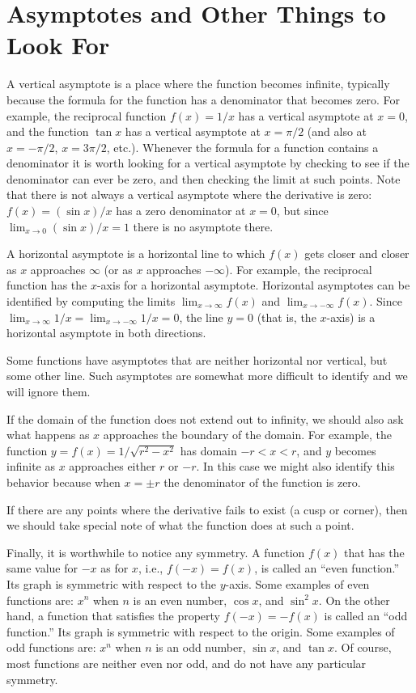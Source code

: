 \section{Asymptotes and Other Things to Look For}  {}{}
\nobreak
A vertical asymptote is a place where the function
becomes infinite, typically because the formula for the function has a
denominator that becomes zero.  For example, the reciprocal function
$f(x)=1/x$ has a vertical asymptote at $x=0$, and the function $\tan
x$ has a vertical asymptote at $x=\pi/2$ (and also at $x=-\pi/2$,
$x=3\pi/2$, etc.).  Whenever the formula for a function contains a
denominator it is worth looking for a vertical asymptote by 
checking to see if the denominator can ever be zero, and then checking
the limit at such points. Note that there is not always a vertical
asymptote where the derivative is zero: $f(x)=(\sin x)/x$ has a zero
denominator at $x=0$, but since $\lim_{x\to 0}(\sin x)/x=1$ there is
no asymptote there.

A horizontal asymptote is a horizontal line to which $f(x)$ gets closer and
closer as $x$ approaches $\infty$ (or as $x$ approaches $-\infty$).  For
example, the reciprocal function has the $x$-axis for a horizontal
asymptote.  Horizontal asymptotes can be identified by computing 
the limits $\lim_{x \to \infty}f(x)$ and $\lim_{x \to -\infty}f(x)$.
Since $\lim_{x \to \infty}1/x=\lim_{x \to -\infty}1/x=0$, the line
$y=0$ (that is, the $x$-axis) is a horizontal asymptote in both directions.

Some functions have asymptotes that are neither horizontal nor
vertical, but some other line. Such asymptotes are somewhat more
difficult to identify and we will ignore them.

If the domain of the function does not extend out to infinity, we should
also ask what happens as $x$ approaches the boundary of the domain.  For
example, the function $y=f(x)=1/\sqrt{r^2-x^2}$ has domain $-r<x<r$, and
$y$ becomes infinite as $x$ approaches either $r$ or $-r$. In this
case we might also identify this behavior because when $x=\pm r$ the
denominator of the function is zero.

If there are any points where the derivative fails to exist (a cusp or
corner), then we should take special note of what the function does at such
a point.

Finally, it is worthwhile to notice any symmetry.  A function $f(x)$ that
has the same value for $-x$ as for $x$, i.e., $f(-x)=f(x)$, is called an
``even function.''  Its graph is symmetric with respect to the $y$-axis.
Some examples of even functions are: $x^n$ when $n$ is an even number,
$\cos x$, and $\sin^2x$.  On the other hand, a function that satisfies the
property $f(-x)=-f(x)$ is called an ``odd function.''  Its graph is
symmetric with respect to the origin.  Some examples of odd functions are:
$x^n$ when $n$ is an odd number, $\sin x$, and $\tan x$.  Of course, most
functions are neither even nor odd, and do not have any particular
symmetry.
 
